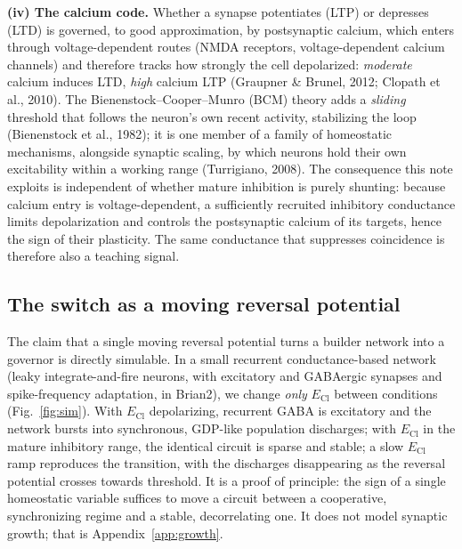 \documentclass[11pt,a4paper]{article}
\newcommand{\ECl}{E_{\mathrm{Cl}}}
\begin{document}
\textbf{(iv) The calcium code.} Whether a synapse potentiates (LTP) or depresses (LTD) is governed, to good approximation, by postsynaptic calcium, which enters through voltage-dependent routes (NMDA receptors, voltage-dependent calcium channels) and therefore tracks how strongly the cell depolarized: \emph{moderate} calcium induces LTD, \emph{high} calcium LTP (Graupner \& Brunel, 2012; Clopath et al., 2010). The Bienenstock--Cooper--Munro (BCM) theory adds a \emph{sliding} threshold that follows the neuron's own recent activity, stabilizing the loop (Bienenstock et al., 1982); it is one member of a family of homeostatic mechanisms, alongside synaptic scaling, by which neurons hold their own excitability within a working range (Turrigiano, 2008). The consequence this note exploits is independent of whether mature inhibition is purely shunting: because calcium entry is voltage-dependent, a sufficiently recruited inhibitory conductance limits depolarization and controls the postsynaptic calcium of its targets, hence the sign of their plasticity. The same conductance that suppresses coincidence is therefore also a teaching signal.

\subsection{The switch as a moving reversal potential}\label{app:switchsim}
The claim that a single moving reversal potential turns a builder network into a governor is directly simulable. In a small recurrent conductance-based network (leaky integrate-and-fire neurons, with excitatory and GABAergic synapses and spike-frequency adaptation, in Brian2), we change \emph{only} $\ECl$ between conditions (Fig.~\ref{fig:sim}). With $\ECl$ depolarizing, recurrent GABA is excitatory and the network bursts into synchronous, GDP-like population discharges; with $\ECl$ in the mature inhibitory range, the identical circuit is sparse and stable; a slow $\ECl$ ramp reproduces the transition, with the discharges disappearing as the reversal potential crosses towards threshold. It is a proof of principle: the sign of a single homeostatic variable suffices to move a circuit between a cooperative, synchronizing regime and a stable, decorrelating one. It does not model synaptic growth; that is Appendix~\ref{app:growth}.
\end{document}
